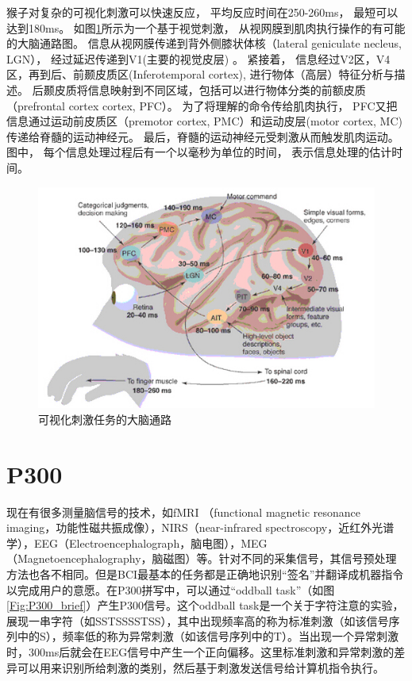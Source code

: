 猴子对复杂的可视化刺激可以快速反应， 平均反应时间在250-260ms， 最短可以达到180ms。 如图\ref{Fig:brain_stimulate_flow}所示为一个基于视觉刺激， 从视网膜到肌肉执行操作的有可能的大脑通路图\cite{thorpe2001seeking}。 信息从视网膜传递到背外侧膝状体核（lateral geniculate necleus, LGN）， 经过延迟传递到V1(主要的视觉皮层) 。 紧接着， 信息经过V2区，V4区，再到后、前颞皮质区(Inferotemporal cortex), 进行物体（高层）特征分析与描述。 后颞皮质将信息映射到不同区域，包括可以进行物体分类的前额皮质（prefrontal cortex cortex, PFC）。 为了将理解的命令传给肌肉执行， PFC又把信息通过运动前皮质区（premotor cortex, PMC）和运动皮层(motor cortex, MC)传递给脊髓的运动神经元。 最后，脊髓的运动神经元受刺激从而触发肌肉运动。 图中， 每个信息处理过程后有一个以毫秒为单位的时间， 表示信息处理的估计时间。


\begin{figure}[htb]
\centering
\includegraphics{Pictures/Introduction/brain_flow.jpg}
\caption{可视化刺激任务的大脑通路}
\label{Fig:brain_stimulate_flow}
\end{figure}


\section{P300}\label{sec:introduction_p300}


现在有很多测量脑信号的技术，如fMRI （functional magnetic resonance imaging，功能性磁共振成像），NIRS（near-infrared spectroscopy，近红外光谱学），EEG（Electroencephalograph，脑电图），MEG（Magnetoencephalography，脑磁图）等。针对不同的采集信号，其信号预处理方法也各不相同。但是BCI最基本的任务都是正确地识别“签名”并翻译成机器指令以完成用户的意愿。在P300拼写中，可以通过“oddball task”（如图\ref{Fig:P300_brief}）产生P300信号。这个oddball task是一个关于字符注意的实验，展现一串字符（如SSTSSSSTSS），其中出现频率高的称为标准刺激（如该信号序列中的S），频率低的称为异常刺激（如该信号序列中的T）。当出现一个异常刺激时，300ms后就会在EEG信号中产生一个正向偏移。这里标准刺激和异常刺激的差异可以用来识别所给刺激的类别，然后基于刺激发送信号给计算机指令执行。
 
